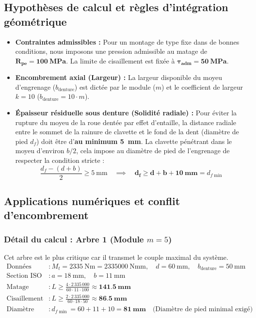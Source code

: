 \documentclass[11pt,a4paper]{article}
\begin{document}
\subsection{Hypothèses de calcul et règles d'intégration géométrique}

\begin{itemize}
    \item \textbf{Contraintes admissibles :} Pour un montage de type fixe dans de bonnes conditions, nous imposons une pression admissible au matage de $\mathbf{R_{pe} = \qty{100}{\mega\pascal}}$. La limite de cisaillement est fixée à $\mathbf{\tau_{\text{adm}} = \qty{50}{\mega\pascal}}$.
    \item \textbf{Encombrement axial (Largeur) :} La largeur disponible du moyeu d'engrenage ($b_{\text{denture}}$) est dictée par le module ($m$) et le coefficient de largeur $k = 10$ ($b_{\text{denture}} = 10 \cdot m$).
    \item \textbf{Épaisseur résiduelle sous denture (Solidité radiale) :} Pour éviter la rupture du moyeu de la roue dentée par effet d'entaille, la distance radiale entre le sommet de la rainure de clavette et le fond de la dent (diamètre de pied $d_f$) doit être d'\textbf{au minimum \qty{5}{\milli\meter}}. La clavette pénétrant dans le moyeu d'environ $b/2$, cela impose au diamètre de pied de l'engrenage de respecter la condition stricte : 
    \[ \frac{d_f - (d + b)}{2} \ge \qty{5}{\milli\meter} \quad \implies \quad \mathbf{d_f \ge d + b + \qty{10}{\milli\meter}} = d_{f\min} \]
\end{itemize}

\subsection{Applications numériques et conflit d'encombrement}

\subsubsection*{Détail du calcul : Arbre 1 (Module $m = 5$)}
Cet arbre est le plus critique car il transmet le couple maximal du système.
\begin{align*}
    \text{Données} & : M_t = \qty{2335}{\newton\meter} = \qty{2335000}{\newton\milli\meter}, \quad d = \qty{60}{\milli\meter}, \quad b_{\text{denture}} = \qty{50}{\milli\meter} \\
    \text{Section ISO 773} & : a = \qty{18}{\milli\meter}, \quad b = \qty{11}{\milli\meter} \\
    \text{Matage (Critique)} & : L \ge \frac{4 \cdot 2\,335\,000}{60 \cdot 11 \cdot 100} \approx \mathbf{\qty{141,5}{\milli\meter}} \\
    \text{Cisaillement} & : L \ge \frac{2 \cdot 2\,335\,000}{60 \cdot 18 \cdot 50} \approx \mathbf{\qty{86,5}{\milli\meter}} \\
    \text{Diamètre minimal} & : d_{f\min} = 60 + 11 + 10 = \mathbf{\qty{81}{\milli\meter}} \quad \text{(Diamètre de pied minimal exigé)}
\end{align*}
\end{document}
